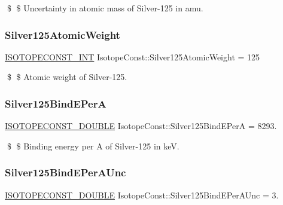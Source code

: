 \$ \$ Uncertainty in atomic mass of Silver-\/125 in amu. \mbox{\label{group___isotope_const-_silver-_ag125_ga2cf75e5fae95fc3d80cf2351b90b12b3}} 
\subsubsection{\texorpdfstring{Silver125\+Atomic\+Weight}{Silver125AtomicWeight}}
{\footnotesize\ttfamily \mbox{\hyperlink{group___isotope_const-_macros_ga5f18360b3e99483a35c32d789e62621c}{I\+S\+O\+T\+O\+P\+E\+C\+O\+N\+S\+T\+\_\+\+I\+NT}} Isotope\+Const\+::\+Silver125\+Atomic\+Weight = 125}

\$ \$ Atomic weight of Silver-\/125. \mbox{\label{group___isotope_const-_silver-_ag125_gafe590bfacf2673b2926f5c1007361540}} 
\subsubsection{\texorpdfstring{Silver125\+Bind\+E\+PerA}{Silver125BindEPerA}}
{\footnotesize\ttfamily \mbox{\hyperlink{group___isotope_const-_macros_ga8f45a7272ce02c0b4c65c44636ed719a}{I\+S\+O\+T\+O\+P\+E\+C\+O\+N\+S\+T\+\_\+\+D\+O\+U\+B\+LE}} Isotope\+Const\+::\+Silver125\+Bind\+E\+PerA = 8293.}

\$ \$ Binding energy per A of Silver-\/125 in keV. \mbox{\label{group___isotope_const-_silver-_ag125_ga9dfb1254b7771df3a3148d24cee499d3}} 
\subsubsection{\texorpdfstring{Silver125\+Bind\+E\+Per\+A\+Unc}{Silver125BindEPerAUnc}}
{\footnotesize\ttfamily \mbox{\hyperlink{group___isotope_const-_macros_ga8f45a7272ce02c0b4c65c44636ed719a}{I\+S\+O\+T\+O\+P\+E\+C\+O\+N\+S\+T\+\_\+\+D\+O\+U\+B\+LE}} Isotope\+Const\+::\+Silver125\+Bind\+E\+Per\+A\+Unc = 3.}

